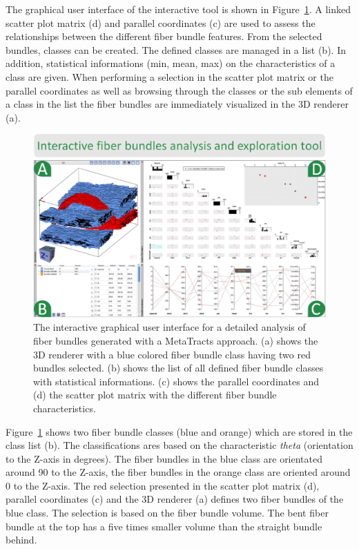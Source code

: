The graphical user interface of the interactive tool is shown in Figure~\ref{fig:interactive_tool_gui}. A linked scatter plot matrix (d) and parallel coordinates (c) are used to assess the relationships between the different fiber bundle features. From the selected bundles, classes can be created. The defined classes are managed in a list (b). In addition, statistical informations (min, mean, max) on the characteristics of a class are given. When performing a selection in the scatter plot matrix or the parallel coordinates as well as browsing through the classes or the sub elements of a class in the list the fiber bundles are immediately visualized in the 3D renderer (a).
\begin{figure}[t]
	\centering
	\includegraphics[width=\linewidth]{images/FiberScout_GUI.eps}
	\caption{The interactive graphical user interface for a detailed analysis of fiber bundles generated with a MetaTracts approach. (a) shows the 3D renderer with a blue colored fiber bundle class having two red bundles selected. (b) shows the list of all defined fiber bundle classes with statistical informations. (c) shows the parallel coordinates and (d) the scatter plot matrix with the different fiber bundle characteristics.}
	\label{fig:interactive_tool_gui}
\end{figure}
Figure~\ref{fig:interactive_tool_gui} shows two fiber bundle classes (blue and orange) which are stored in the class list (b). The classifications ares based on the characteristic \textit{theta} (orientation to the Z-axis in degrees). The fiber bundles in the blue class are orientated around 90{\textdegree} to the Z-axis, the fiber bundles in the orange class are oriented around 0{\textdegree} to the Z-axis. The red selection presented in the scatter plot matrix (d), parallel coordinates (c) and the 3D renderer (a) defines two fiber bundles of the blue class. The selection is based on the fiber bundle volume. The bent fiber bundle at the top has a five times smaller volume than the straight bundle behind.    

